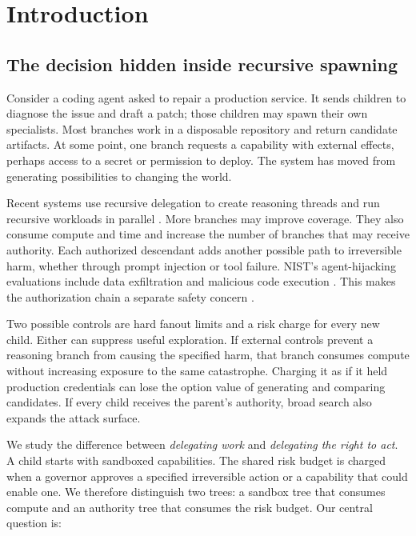 \documentclass[sigconf,nonacm]{acmart}
\begin{document}
\maketitle

\section{Introduction}

\subsection{The decision hidden inside recursive spawning}

Consider a coding agent asked to repair a production service.  It sends children to diagnose the
issue and draft a patch; those children may spawn their own specialists.  Most branches work in
a disposable repository and return candidate artifacts.  At some point, one branch requests a
capability with external effects, perhaps access to a secret or permission to deploy.  The system
has moved from generating possibilities to changing the world.

Recent systems use recursive delegation to create reasoning threads and run recursive workloads
in parallel \cite{schroeder2025thread,song2026webswarm}.  More branches may improve coverage.  They
also consume compute and time and increase the number of branches that may receive
authority.  Each authorized descendant adds another possible path to irreversible harm, whether
through prompt injection or tool failure.  NIST's agent-hijacking evaluations include data
exfiltration and malicious code execution \cite{nist2025hijacking}.  This makes the authorization
chain a separate safety concern \cite{south2025delegation}.

Two possible controls are hard fanout limits and a risk charge for every new child.  Either can
suppress useful exploration.  If external controls prevent a reasoning branch from causing the
specified harm, that branch consumes compute without increasing exposure to the same catastrophe.
Charging it as if it held production credentials can lose the option value of generating and
comparing candidates.  If every child receives the parent's authority, broad search also expands
the attack surface.

We study the difference between \emph{delegating work} and \emph{delegating the right to act}.
A child starts with sandboxed capabilities.  The shared risk budget is charged when a governor
approves a specified irreversible action or a capability that could enable one.  We therefore
distinguish two trees: a sandbox tree that consumes compute and an authority tree that consumes
the risk budget.  Our central question is:
\end{document}
